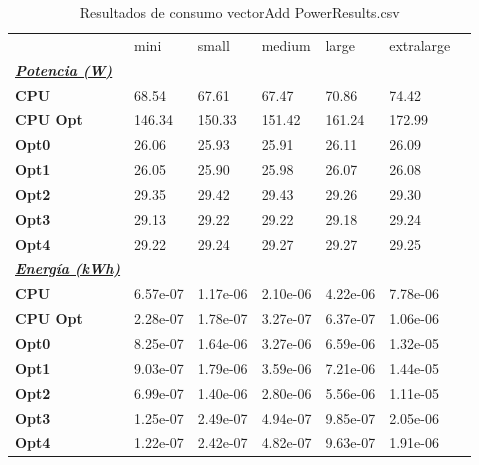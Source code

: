 \begin{table}[H]
    \centering
    \begin{tabular}{lllllll}
    \rowcolor[HTML]{DAE8FC} \ & mini & small & medium & 	large & 	extralarge \\
    \cellcolor[HTML]{DAE8FC} \textbf{\textbf{{\emph{{\underline{{Potencia (W)}}}}}}} &  &  &  & 	 & 	 \\
    \rowcolor[HTML]{EFEFEF} \cellcolor[HTML]{DAE8FC} \textbf{CPU} & 68.54 & 67.61 & 67.47 & 	70.86 & 	74.42 \\
    \cellcolor[HTML]{DAE8FC} \textbf{CPU Opt} & 146.34 & 150.33 & 151.42 & 	161.24 & 	172.99 \\
    \rowcolor[HTML]{EFEFEF} \cellcolor[HTML]{DAE8FC} \textbf{Opt0} & 26.06 & 25.93 & 25.91 & 	26.11 & 	26.09 \\
    \cellcolor[HTML]{DAE8FC} \textbf{Opt1} & 26.05 & 25.90 & 25.98 & 	26.07 & 	26.08 \\
    \rowcolor[HTML]{EFEFEF} \cellcolor[HTML]{DAE8FC} \textbf{Opt2} & 29.35 & 29.42 & 29.43 & 	29.26 & 	29.30 \\
    \cellcolor[HTML]{DAE8FC} \textbf{Opt3} & 29.13 & 29.22 & 29.22 & 	29.18 & 	29.24 \\
    \rowcolor[HTML]{EFEFEF} \cellcolor[HTML]{DAE8FC} \textbf{Opt4} & 29.22 & 29.24 & 29.27 & 	29.27 & 	29.25 \\
    \cellcolor[HTML]{DAE8FC} \textbf{\textbf{{\emph{{\underline{{Energía (kWh)}}}}}}} &  &  &  & 	 & 	 \\
    \rowcolor[HTML]{EFEFEF} \cellcolor[HTML]{DAE8FC} \textbf{CPU} & 6.57e-07 & 1.17e-06 & 2.10e-06 & 	4.22e-06 & 	7.78e-06 \\
    \cellcolor[HTML]{DAE8FC} \textbf{CPU Opt} & 2.28e-07 & 1.78e-07 & 3.27e-07 & 	6.37e-07 & 	1.06e-06 \\
    \rowcolor[HTML]{EFEFEF} \cellcolor[HTML]{DAE8FC} \textbf{Opt0} & 8.25e-07 & 1.64e-06 & 3.27e-06 & 	6.59e-06 & 	1.32e-05 \\
    \cellcolor[HTML]{DAE8FC} \textbf{Opt1} & 9.03e-07 & 1.79e-06 & 3.59e-06 & 	7.21e-06 & 	1.44e-05 \\
    \rowcolor[HTML]{EFEFEF} \cellcolor[HTML]{DAE8FC} \textbf{Opt2} & 6.99e-07 & 1.40e-06 & 2.80e-06 & 	5.56e-06 & 	1.11e-05 \\
    \cellcolor[HTML]{DAE8FC} \textbf{Opt3} & 1.25e-07 & 2.49e-07 & 4.94e-07 & 	9.85e-07 & 	2.05e-06 \\
    \rowcolor[HTML]{EFEFEF} \cellcolor[HTML]{DAE8FC} \textbf{Opt4} & 1.22e-07 & 2.42e-07 & 4.82e-07 & 	9.63e-07 & 	1.91e-06 \\
    \end{tabular}
    \caption[Resultados de consumo vectorAdd PowerResults.csv]{{Resultados de consumo vectorAdd PowerResults.csv}}
    \label{table_global_vectorAdd_PowerResults_data}
\end{table}